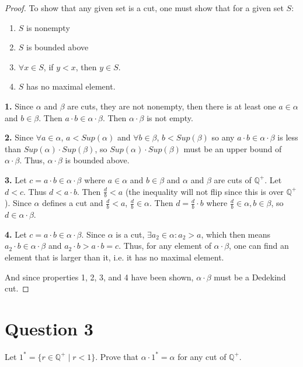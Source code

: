 \documentclass[12pt, letterpaper]{article}
\begin{document}
\begin{proof}

\noindent To show that any given set is a cut, one must show that for a given set $S$:
\begin{enumerate}
  \item $S$ is nonempty
  \item $S$ is bounded above
  \item $\forall x \in S$, if $y < x$, then $y \in S$.
  \item $S$ has no maximal element.
\end{enumerate}
\noindent\textbf{1.} Since $\alpha$ and $\beta$ are cuts, they are not nonempty, then there is at least one $a \in \alpha$ and $b \in \beta$. Then $a \cdot b \in \alpha \cdot \beta$. Then $\alpha \cdot \beta$ is not empty.

\noindent\textbf{2.} Since $\forall a \in \alpha$, $a < Sup(\alpha)$ and  $\forall b \in \beta$, $b < Sup(\beta)$ so any $a \cdot b \in \alpha \cdot \beta$ is less than $Sup(\alpha) \cdot Sup(\beta)$,
so $Sup(\alpha) \cdot Sup(\beta)$ must be an upper bound of $\alpha \cdot \beta$. Thus, $\alpha \cdot \beta$ is bounded above.

\noindent\textbf{3.} Let $c = a \cdot b \in \alpha \cdot \beta$ where $a \in \alpha$ and $b \in \beta$ and $\alpha$ and $\beta$ are cuts of $\mathbb{Q}^+$. Let $d < c$. Thus $d < a \cdot b$. Then $\frac{d}{b} < a$ (the inequality will not flip since this is over $\mathbb{Q}^+$).
Since $\alpha$ defines a cut and $\frac{d}{b} < a$, $\frac{d}{b} \in \alpha$. Then $d = \frac{d}{b} \cdot b$ where $\frac{d}{b} \in \alpha, b \in \beta$, so $d \in \alpha \cdot \beta$.

\noindent\textbf{4.} Let $c = a \cdot b \in \alpha \cdot \beta$. Since $\alpha$ is a cut, $\exists a_2 \in \alpha: a_2 > a$,
 which then means $a_2 \cdot b \in \alpha \cdot \beta$ and $ a_2 \cdot b > a \cdot b = c$. Thus, for any element of $\alpha \cdot \beta$,
 one can find an element that is larger than it, i.e. it has no maximal element.

\noindent And since properties 1, 2, 3, and 4 have been shown, $\alpha \cdot \beta$ must be a Dedekind cut.
\end{proof}
\pagebreak
\section*{Question 3}
Let $1^* = \{ r \in \mathbb{Q}^+ \mid r < 1 \}$. Prove that $\alpha \cdot 1^* = \alpha$ for any cut of $\mathbb{Q}^+$.
\end{document}
